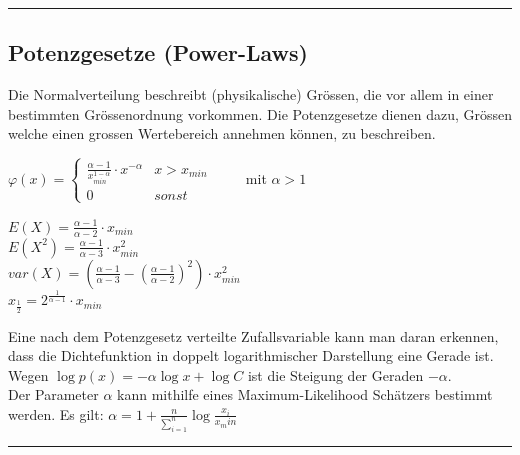   \hrule 
      
	\subsection{Potenzgesetze (Power-Laws) }
	Die Normalverteilung beschreibt (physikalische) Grössen, die vor allem in einer bestimmten
	Grössenordnung vorkommen. Die Potenzgesetze dienen dazu, Grössen welche einen grossen
	Wertebereich annehmen können, zu beschreiben.
	
    \begin{multicols}{2}
		$\varphi(x) = \begin{cases}
		\frac{\alpha - 1}{x_{min}^{1-\alpha}}\cdot x^{-\alpha} & x > x_{min} \\
		0 & sonst
		\end{cases} \qquad $ mit $\alpha > 1$\\
		
    \columnbreak
    
		$E(X) = \frac{\alpha - 1}{\alpha - 2} \cdot x_{min}$ \\
		$E(X^2) = \frac{\alpha - 1}{\alpha - 3} \cdot x_{min}^2$ \\
 		$var(X) = \left(\frac{\alpha - 1}{\alpha - 3} - \left(\frac{\alpha -1}{\alpha -2}\right)^2\right)\cdot x_{min}^2$ \\
 		$x_{\frac{1}{2}} = 2^{\frac{1}{\alpha - 1}} \cdot x_{min}$ \\
	\end{multicols}
	
	Eine nach dem Potenzgesetz verteilte Zufallsvariable kann man daran erkennen, dass die Dichtefunktion in doppelt logarithmischer Darstellung eine Gerade ist. Wegen
	$\log p(x) = -\alpha \log x + \log C$ ist die Steigung der Geraden $-\alpha$. \\
	
	Der Parameter $\alpha$ kann mithilfe eines Maximum-Likelihood Schätzers bestimmt werden. Es gilt: $\alpha = 1 + \frac{n}{\sum_{i=1}^{n}} \log \frac{x_i}{x_min}$ \\
\hrule